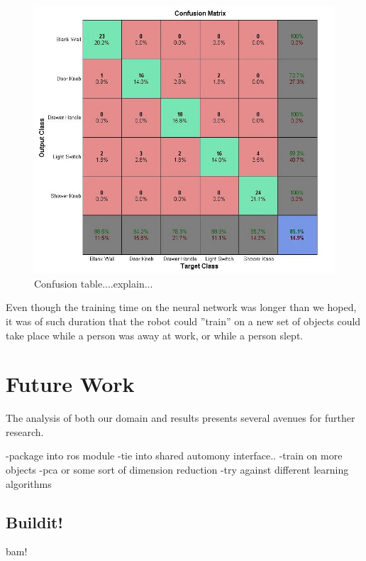 \documentclass{article}
\begin{document}
\begin{figure}[h!]
    \centering
    \includegraphics[width=.8\textwidth]{confusion.jpg}
    \caption{Confusion table....explain...}
    \label{fig:confusion}
\end{figure}

Even though the training time on the neural network was longer than we hoped, it was of such duration that the robot could ''train'' on a new set of objects could take place while a person was away at work, or while a person slept.

\section{Future Work}
The analysis of both our domain and results presents several avenues for further research.

-package into ros module
-tie into shared automony interface..
-train on more objects
-pca or some sort of dimension reduction
-try against different learning algorithms

\subsection{Buildit!}
bam!



\end{document}
